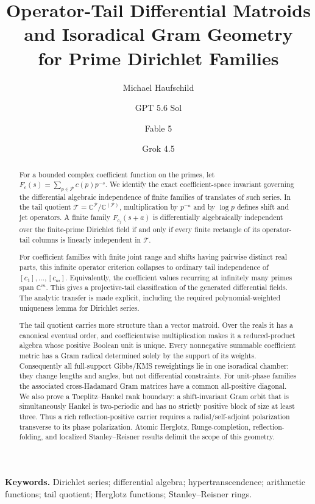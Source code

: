 \documentclass[11pt]{article}
\title{Operator-Tail Differential Matroids and Isoradical Gram Geometry\\
for Prime Dirichlet Families}
\author{Michael Haufschild \and GPT 5.6 Sol \and Fable 5 \and Grok 4.5}
\date{}
\theoremstyle{definition}
\theoremstyle{remark}
\newcommand{\C}{\mathbb C}
\newcommand{\cP}{\mathcal P}
\newcommand{\cT}{\mathcal T}
\begin{document}
\maketitle

\begin{abstract}
For a bounded complex coefficient function on the primes, let
\(F_c(s)=\sum_{p\in\cP}c(p)p^{-s}\).  We identify the exact
coefficient-space invariant governing the differential algebraic independence of finite
families of translates of such series.  In the tail quotient
\(\cT=\C^{\cP}/\C^{(\cP)}\), multiplication by \(p^{-a}\) and by \(\log p\)
defines shift and jet operators.  A finite family
\(F_{c_j}(s+a)\) is differentially algebraically independent over the finite-prime
Dirichlet field if and only if every finite rectangle of its operator-tail columns is
linearly independent in \(\cT\).

For coefficient families with finite joint range and shifts having pairwise distinct real
parts, this infinite operator criterion collapses to ordinary tail independence of
\([c_1],\ldots,[c_m]\).  Equivalently, the coefficient values recurring at infinitely
many primes span \(\C^m\).  This gives a projective-tail classification of the generated
differential fields.  The analytic transfer is made explicit, including the required
polynomial-weighted uniqueness lemma for Dirichlet series.

The tail quotient carries more structure than a vector matroid.  Over the reals it has a
canonical eventual order, and coefficientwise multiplication makes it a reduced-product
algebra whose positive Boolean unit is unique.  Every nonnegative summable coefficient metric
has a Gram radical determined solely by the support of its weights.  Consequently all
full-support Gibbs/KMS reweightings lie in one isoradical chamber: they change lengths and
angles, but not differential constraints.  For unit-phase families the associated
cross-Hadamard Gram matrices have a common all-positive diagonal.  We also prove a
Toeplitz--Hankel rank boundary: a shift-invariant Gram orbit that is simultaneously Hankel is
two-periodic and has no strictly positive block of size at least three.  Thus a rich
reflection-positive carrier requires a radial/self-adjoint polarization transverse to its
phase polarization.  Atomic Herglotz, Runge-completion, reflection-folding, and localized
Stanley--Reisner results delimit the scope of this geometry.
\end{abstract}

\noindent\textbf{Keywords.}
Dirichlet series; differential algebra; hypertranscendence; arithmetic functions;
tail quotient; Herglotz functions; Stanley--Reisner rings.
\end{document}
